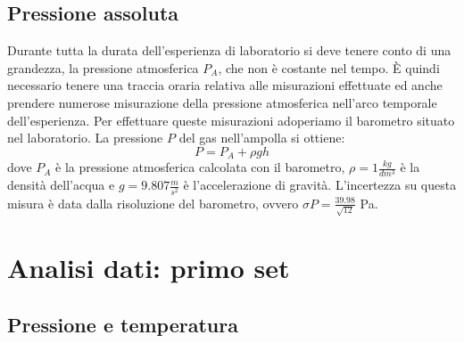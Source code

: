 \subsection{Pressione assoluta}
Durante tutta la durata dell'esperienza di laboratorio si deve tenere conto di una grandezza, la pressione atmosferica $P_A$, che non è costante nel tempo.
È quindi necessario tenere una traccia oraria relativa alle misurazioni effettuate ed anche prendere numerose misurazione della pressione atmosferica nell'arco temporale dell'esperienza.
Per effettuare queste misurazioni adoperiamo il barometro situato nel laboratorio.
La pressione $P$ del gas nell'ampolla si ottiene:
\begin{equation}
P = P_A + \rho g h
\end{equation}
dove $P_A$ è la pressione atmosferica calcolata con il barometro, $\rho = 1 \frac{kg}{dm^3}$ è la densità dell'acqua e $g = 9.807 \frac{m}{s^2}$
è l'accelerazione di gravità.
L'incertezza su questa misura è data dalla risoluzione del barometro, ovvero $\sigma P = \frac{39.98}{\sqrt{12}}$ Pa.

\section{Analisi dati: primo set}
\subsection{Pressione e temperatura}

